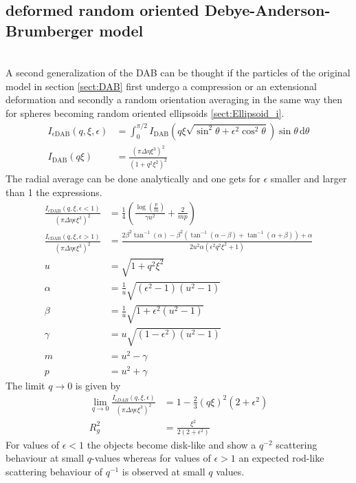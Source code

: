 \subsection{deformed random oriented Debye-Anderson-Brumberger model}
\label{sect:epsilonDAB}~\\
A second generalization of the DAB can be thought if the particles of the original model in section \ref{sect:DAB} first undergo a compression or an extensional deformation and secondly a random orientation averaging in the same way then for spheres becoming random oriented ellipsoids \ref{sect:Ellipsoid_i}. 
\begin{align}
   \label{eq:DABaffPLUSrnd}
  I_{\epsilon\mathrm{DAB}}(q,\xi,\epsilon) &= \int_0^{\pi/2}I_\mathrm{DAB}\left(q\xi\sqrt{\sin^2\theta+\epsilon^2\cos^2\theta}\right) \sin\theta\, \mathrm{d}\theta \\
  I_\mathrm{DAB}(q\xi) &= \frac{\left(\pi\Delta\eta\xi^3\right)^2}{\left(1+q^2\xi^2\right)^2}
\end{align}
The radial average can be done analytically and one gets for $\epsilon$ smaller and larger than 1 the expressions.
\begin{align}\label{eq:DABaffPLUSrnd_eps_small}
   \frac{I_{\epsilon\mathrm{DAB}}(q,\xi,\epsilon{<}1)}{\left(\pi\Delta\eta\epsilon\xi^3\right)^2} &=\frac{1}{4} \left(\frac{\log \left(\frac{p}{m}\right)}{\gamma  u^2}+\frac{2}{m p}\right) \\
   \frac{I_{\epsilon\mathrm{DAB}}(q,\xi,\epsilon{>}1)}{\left(\pi\Delta\eta\epsilon\xi^3\right)^2} &= \frac{2 \beta^2 \tan ^{-1}(\alpha)-\beta^2 \left(\tan ^{-1}(\alpha{-}\beta)+\tan ^{-1}(\alpha{+}\beta)\right)+\alpha}{2 u^2\alpha \left(
   \epsilon ^2 q^2 \xi ^2+1\right)} \\
   u &= \sqrt{1+q^2\xi^2} \\
  \alpha & =\frac{1}{u} \sqrt{\left(\epsilon^2-1\right)\left(u^2-1\right)}\\
  \beta &=  \frac{1}{u}\sqrt{1+\epsilon^2\left(u^2-1\right)}\\
  \gamma &= u\sqrt{\left(1-\epsilon^2\right)\left(u^2-1\right)} \\
  m &=u^2-\gamma \\
  p &= u^2+\gamma
\end{align}
The limit $q\to 0$ is given by
\begin{align}
  \lim_{q\to 0} \frac{I_{\epsilon DAB}(q,\xi,\epsilon)}{\left(\pi\Delta\eta\epsilon\xi^3\right)^2}& = 1 - \frac23 (q\xi)^2(2+\epsilon^2) \\
  R_g^2 & =  \frac{\xi^2}{2(2+\epsilon^2)}
\end{align}
For values of $\epsilon<1$ the objects become disk-like and show a $q^{-2}$ scattering behaviour at small $q$-values whereas for values of $\epsilon>1$ an expected rod-like scattering behaviour of $q^{-1}$ is observed at small $q$ values.



